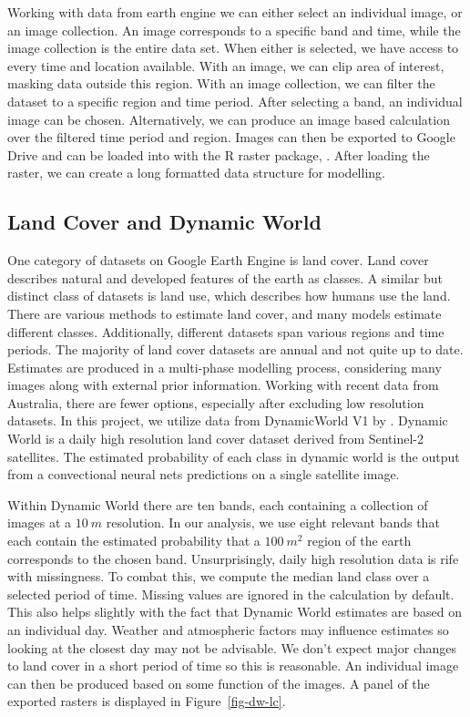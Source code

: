 \documentclass[
  12pt,
  letterpaper,
  DIV=11,
  numbers=noendperiod]{scrartcl}
\begin{document}
Working with data from earth engine we can either select an individual
image, or an image collection. An image corresponds to a specific band
and time, while the image collection is the entire data set. When either
is selected, we have access to every time and location available. With
an image, we can clip area of interest, masking data outside this
region. With an image collection, we can filter the dataset to a
specific region and time period. After selecting a band, an individual
image can be chosen. Alternatively, we can produce an image based
calculation over the filtered time period and region. Images can then be
exported to Google Drive and can be loaded into with the R raster
package, \cite{raster}. After loading the raster, we can create a long
formatted data structure for modelling.

\subsection{Land Cover and Dynamic
World}\label{land-cover-and-dynamic-world}

One category of datasets on Google Earth Engine is land cover. Land
cover describes natural and developed features of the earth as classes.
A similar but distinct class of datasets is land use, which describes
how humans use the land. There are various methods to estimate land
cover, and many models estimate different classes. Additionally,
different datasets span various regions and time periods. The majority
of land cover datasets are annual and not quite up to date. Estimates
are produced in a multi-phase modelling process, considering many images
along with external prior information. Working with recent data from
Australia, there are fewer options, especially after excluding low
resolution datasets. In this project, we utilize data from DynamicWorld
V1 by \cite{dynamic_world}. Dynamic World is a daily high resolution
land cover dataset derived from Sentinel-2 satellites. The estimated
probability of each class in dynamic world is the output from a
convectional neural nets predictions on a single satellite image.

Within Dynamic World there are ten bands, each containing a collection
of images at a \(10\ m\) resolution. In our analysis, we use eight
relevant bands that each contain the estimated probability that a
\(100\ m^2\) region of the earth corresponds to the chosen band.
Unsurprisingly, daily high resolution data is rife with missingness. To
combat this, we compute the median land class over a selected period of
time. Missing values are ignored in the calculation by default. This
also helps slightly with the fact that Dynamic World estimates are based
on an individual day. Weather and atmospheric factors may influence
estimates so looking at the closest day may not be advisable. We don't
expect major changes to land cover in a short period of time so this is
reasonable. An individual image can then be produced based on some
function of the images. A panel of the exported rasters is displayed in
Figure~\ref{fig-dw-lc}.
\end{document}
